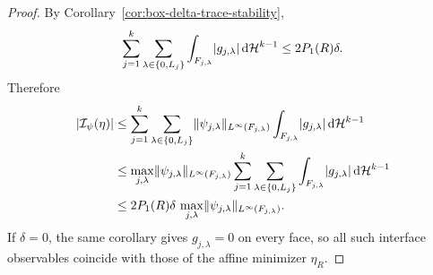 \begin{proof}
By Corollary~\ref{cor:box-delta-trace-stability},
\[
\sum_{j=1}^k\sum_{\lambda\in\{0,L_j\}}
\int_{F_{j,\lambda}}\lvert g_{j,\lambda} \rvert\,\mathrm{d}\mathcal{H}^{k-1}
\le 2P_1(R)\delta .
\]
Therefore
\[
\begin{aligned}
\lvert \mathcal I_\psi(\eta) \rvert
&\le
\sum_{j=1}^k\sum_{\lambda\in\{0,L_j\}}
\lVert \psi_{j,\lambda} \rVert_{L^\infty(F_{j,\lambda})}
\int_{F_{j,\lambda}}\lvert g_{j,\lambda} \rvert\,\mathrm{d}\mathcal{H}^{k-1} \\
&\le
\max_{j,\lambda}\lVert \psi_{j,\lambda} \rVert_{L^\infty(F_{j,\lambda})}
\sum_{j=1}^k\sum_{\lambda\in\{0,L_j\}}
\int_{F_{j,\lambda}}\lvert g_{j,\lambda} \rvert\,\mathrm{d}\mathcal{H}^{k-1} \\
&\le
2P_1(R)\delta\,
\max_{j,\lambda}\lVert \psi_{j,\lambda} \rVert_{L^\infty(F_{j,\lambda})} .
\end{aligned}
\]
If $\delta=0$, the same corollary gives $g_{j,\lambda}=0$ on every face, so
all such interface observables coincide with those of the affine minimizer
$\eta_R$.
\end{proof}
